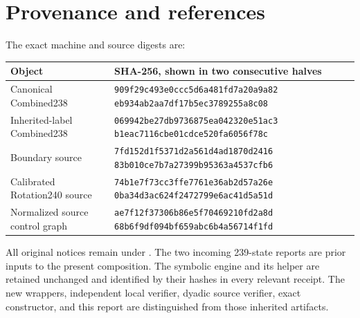 \section{Provenance and references}
\label{sec:references}

The exact machine and source digests are:
\begin{center}\small
\begin{tabular}{@{}L{0.33\textwidth}L{0.58\textwidth}@{}}
\toprule
Object & SHA-256, shown in two consecutive halves\\
\midrule
Canonical Combined238 &
\texttt{909f29c493e0ccc5d6a481fd7a20a9a82}\newline
\texttt{eb934ab2aa7df17b5ec3789255a8c08}\\
Inherited-label Combined238 &
\texttt{069942be27db9736875ea042320e51ac3}\newline
\texttt{b1eac7116cbe01cdce520fa6056f78c}\\
Boundary source &
\texttt{7fd152d1f5371d2a561d4ad1870d2416}\newline
\texttt{83b010ce7b7a27399b95363a4537cfb6}\\
Calibrated Rotation240 source &
\texttt{74b1e7f73cc3ffe7761e36ab2d57a26e}\newline
\texttt{0ba34d3ac624f2472799e6ac41d5a51d}\\
Normalized source control graph &
\texttt{ae7f12f37306b86e5f70469210fd2a8d}\newline
\texttt{68b6f9df094bf659abc6b4a56714f1fd}\\
\bottomrule
\end{tabular}
\end{center}

All original notices remain under . The two
incoming 239-state reports are prior inputs to the present
composition. The symbolic engine and its helper are retained
unchanged and identified by their hashes in every relevant
receipt. The new wrappers, independent local verifier,
dyadic source verifier, exact constructor, and this report
are distinguished from those inherited artifacts.


